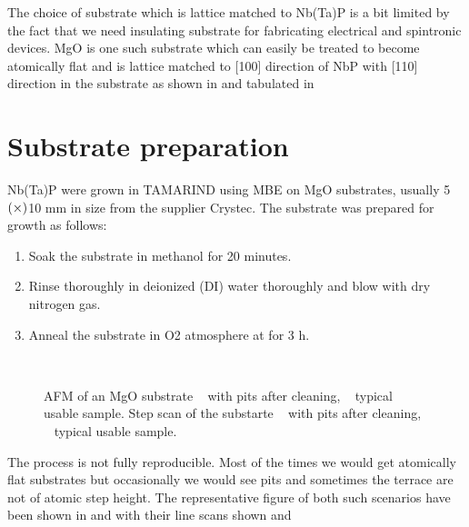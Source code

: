 The choice of substrate which is lattice matched to Nb(Ta)P is a bit limited by the 
fact that we need insulating substrate for fabricating electrical and spintronic 
devices. MgO is one such substrate which can easily be treated to become atomically
flat and is lattice matched to [100] direction of NbP with [110] direction in the
substrate as shown in  and tabulated in 

\section{Substrate preparation}

Nb(Ta)P were grown in TAMARIND using MBE on MgO substrates, usually 5$\text(\times)$10 mm in 
size from the supplier Crystec. The substrate was prepared for growth as follows:

\begin{enumerate}
    \item Soak the substrate in methanol for 20 minutes.
    \item Rinse thoroughly in deionized (DI) water thoroughly and blow with dry nitrogen gas.
    \item Anneal the substrate in O2 atmosphere at  for 3 h.
\end{enumerate}

\begin{figure}
    \centering
    \\
    \caption{
        AFM of  an MgO substrate 
        \sfA~ with pits after cleaning, 
        \sfB~ typical usable sample.
        Step scan of the substarte  
        \sfC~ with pits after cleaning,
        \sfD~ typical usable sample.
    }
\end{figure}

The process is not fully reproducible. Most of the times we would get atomically flat substrates 
but occasionally we would see pits and sometimes the terrace are not of atomic step height. 
The representative figure of both such scenarios have been shown in  and
  with their line scans shown  and 

